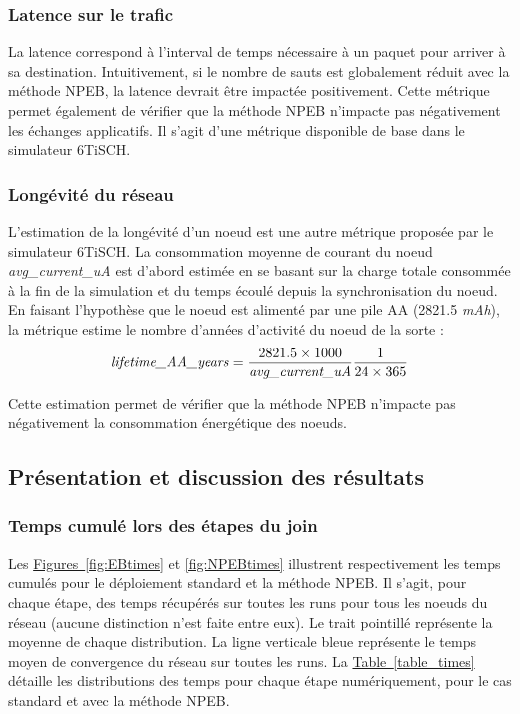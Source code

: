 \documentclass[]{report}
\newcommand{\wordlink}[2]{\hyperref[#2]{#1~\ref{#2}}}
\begin{document}
\subsubsection{Latence sur le trafic}

La latence correspond à l'interval de temps nécessaire à un paquet pour arriver à sa destination. Intuitivement, si le nombre de sauts est globalement réduit avec la méthode NPEB, la latence devrait être impactée positivement. Cette métrique permet également de vérifier que la méthode NPEB n'impacte pas négativement les échanges applicatifs. Il s'agit d'une métrique disponible de base dans le simulateur 6TiSCH.

\subsubsection{Longévité du réseau}

L'estimation de la longévité d'un noeud est une autre métrique proposée par le simulateur 6TiSCH. La consommation moyenne de courant du noeud \textit{avg\_current\_uA} est d'abord estimée en se basant sur la charge totale consommée à la fin de la simulation et du temps écoulé depuis la synchronisation du noeud. En faisant l'hypothèse que le noeud est alimenté par une pile AA (2821.5 \textit{mAh}), la métrique estime le nombre d'années d'activité du noeud de la sorte :
\[
\text{\textit{lifetime\_AA\_years}} = \frac{2821.5 \times 1000}{\text{\textit{avg\_current\_uA}}}
\frac{1}{24 \times 365}
\]

Cette estimation permet de vérifier que la méthode NPEB n'impacte pas négativement la consommation énergétique des noeuds.

\subsection{Présentation et discussion des résultats}

\subsubsection{Temps cumulé lors des étapes du join}

Les \wordlink{Figures}{fig:EBtimes} et \ref{fig:NPEBtimes} illustrent respectivement les temps cumulés pour le déploiement standard et la méthode NPEB. Il s'agit, pour chaque étape, des temps récupérés sur toutes les runs pour tous les noeuds du réseau (aucune distinction n'est faite entre eux). Le trait pointillé représente la moyenne de chaque distribution. La ligne verticale bleue représente le temps moyen de convergence du réseau sur toutes les runs. La \wordlink{Table}{table_times} détaille les distributions des temps pour chaque étape numériquement, pour le cas standard et avec la méthode NPEB.
\end{document}
